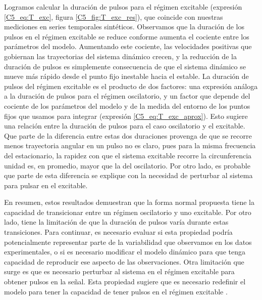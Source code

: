 \documentclass[./main.tex]{subfiles}
\begin{document}
Logramos calcular la duración de pulsos para el régimen excitable (expresión \ref{C5_eq:T_exc}, figura \ref{C5_fig:T_exc_res}), que coincide con nuestras mediciones en series temporales sintéticos. Observamos que la duración de los pulsos en el régimen excitable se reduce conforme aumenta el cociente entre los parámetros del modelo. Aumentando este cociente, las velocidades positivas que gobiernan las trayectorias del sistema dinámico crecen, y la reducción de la duración de pulsos es simplemente consecuencia de que el sistema dinámico se mueve más rápido desde el punto fijo inestable hacia el estable. La duración de pulsos del régimen excitable es el producto de dos factores: una expresión análoga a la duración de pulsos para el régimen oscilatorio, y un factor que depende del cociente de los parámetros del modelo y de la medida del entorno de los puntos fijos que usamos para integrar (expresión \ref{C5_eq:T_exc_aprox}). Esto sugiere una relación entre la duración de pulsos para el caso oscilatorio y el excitable. Que parte de la diferencia entre estas dos duraciones provenga de que se recorre menos trayectoria angular en un pulso no es claro, pues para la misma frecuencia del estacionario, la rapidez con que el sistema excitable recorre la circunferencia unidad es, en promedio, mayor que la del oscilatorio. Por otro lado, es probable que parte de esta diferencia se explique con la necesidad de perturbar al sistema para pulsar en el excitable. 


En resumen, estos resultados demuestran que la forma normal propuesta tiene la capacidad de transicionar entre un régimen oscilatorio y uno excitable. Por otro lado, tiene la limitación de que la duración de pulsos varía durante estas transiciones. Para continuar, es necesario evaluar si esta propiedad podría potencialmente representar parte de la variabilidad que observamos en los datos experimentales, o si es necesario modificar el modelo dinámico para que tenga capacidad de reproducir ese aspecto de las observaciones. Otra limitación que surge es que es necesario perturbar al sistema en el régimen excitable para obtener pulsos en la señal. Esta propiedad sugiere que es necesario redefinir el modelo para tener la capacidad de tener pulsos en el régimen excitable \cite{Lindner2004}. 




\end{document}
